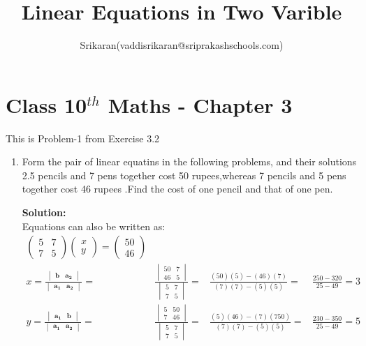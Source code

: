 \documentclass[12pt]{article}
\title{Linear Equations in Two Varible}
\author{Srikaran(vaddisrikaran@sriprakashschools.com)}
\newcommand{\myvec}[1]{\ensuremath{\begin{pmatrix}#1\end{pmatrix}}}
\newcommand{\mydet}[1]{\ensuremath{\begin{vmatrix}#1\end{vmatrix}}}
\newcommand{\solution}{\noindent \textbf{Solution: }}
\let\vec\mathbf
\begin{document}
\maketitle
\section*{Class 10$^{th}$ Maths - Chapter 3}
This is Problem-1 from Exercise 3.2
\begin{enumerate}
\item Form the pair of linear equatins in the following problems, and their solutions\\
2.5 pencils and 7 pens together cost 50 rupees,whereas 7 pencils and 5 pens together cost 46 rupees .Find the cost of one pencil and that of one pen.

\solution \\
            Equations  can also be written as:\\     
\begin{align}
\myvec{5&7\\7&5}\myvec{x\\y} = \myvec{50\\46}\\
x=\frac{\mydet{ \vec{b} & \vec{a_2}}}{\mydet{ \vec{a_1} &\vec{a_2} }} =&
\frac{\mydet{ 50 & 7 \\ 46 & 5 }}{\mydet{5&7\\7&5}} =&
\frac{(50)(5)-(46)(7)}{(7)(7)-(5)(5)} =&
\frac{250-320}{25-49} = 3 \\
y=\frac{\mydet{\vec{a_1}&\vec{b}}}{\mydet{\vec{a_1}&\vec{a_2}}} =&
\frac{\mydet{5&50\\7&46}}{\mydet{5&7\\7&5}} =&
\frac{(5)(46)-(7)(750)}{(7)(7)-(5)(5)} =&
\frac{230-350}{25-49} = 5\\
\end{align}

\end{enumerate}
\end{document}
